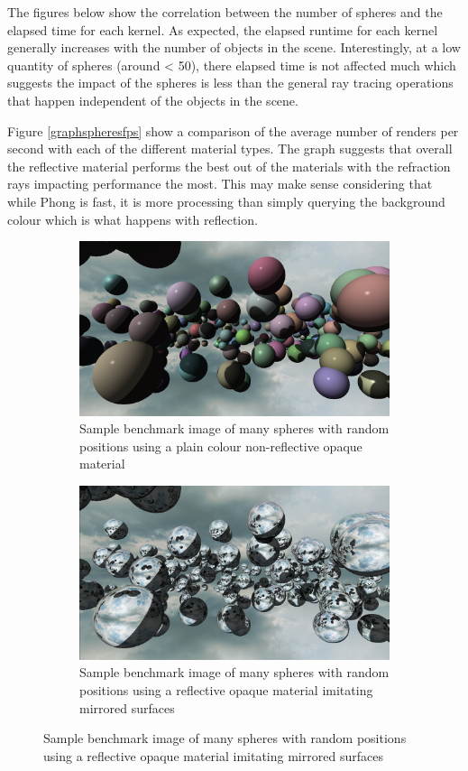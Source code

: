 \documentclass[final]{cmpreport}
\begin{document}
The figures below show the correlation between the number of spheres and the elapsed time for each kernel. As expected, the elapsed runtime for each kernel generally increases with the number of objects in the scene. Interestingly, at a low quantity of spheres (around < 50), there elapsed time is not affected much which suggests the impact of the spheres is less than the general ray tracing operations that happen independent of the objects in the scene.

Figure \ref{graphspheresfps} show a comparison of the average number of renders per second with each of the different material types. The graph suggests that overall the reflective material performs the best out of the materials with the refraction rays impacting performance the most. This may make sense considering that while Phong is fast, it is more processing than simply querying the background colour which is what happens with reflection.

\begin{figure}
    \centering
    \begin{subfigure}{0.5\textwidth}
        \centering
        \includegraphics[width=0.9\linewidth]{img/benchmark_phong.png}
        \caption{Sample benchmark image of many spheres with random positions using a plain colour non-reflective opaque material}
        \label{benchspherephong}
    \end{subfigure}%
    \begin{subfigure}{0.5\textwidth}
        \centering
        \includegraphics[width=0.9\linewidth]{img/benchmark_reflect.png}
        \caption{Sample benchmark image of many spheres with random positions using a reflective opaque material imitating mirrored surfaces}
        \label{benchspherereflect}
    \end{subfigure}
\end{figure}
\end{document}
